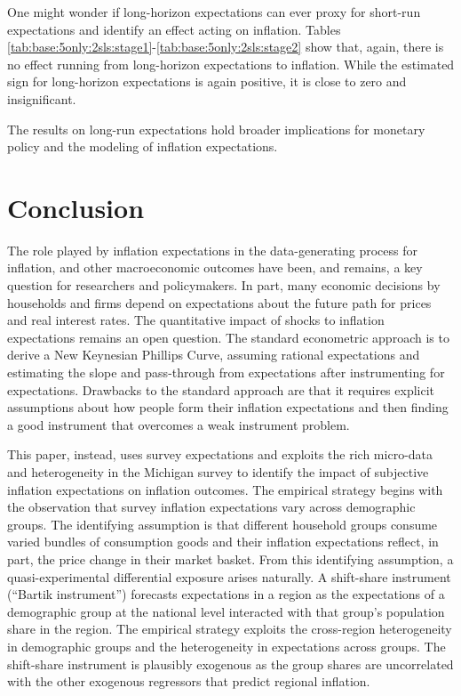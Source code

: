 \documentclass[12pt]{article}
\begin{document}



One might wonder if long-horizon expectations can ever proxy for short-run expectations and identify an effect acting on inflation. Tables \ref{tab:base:5only:2sls:stage1}-\ref{tab:base:5only:2sls:stage2} show that, again, there is no effect running from long-horizon expectations to inflation. While the estimated sign for long-horizon expectations is again positive, it is close to zero and insignificant.  




The results on long-run expectations hold broader implications for monetary policy and the modeling of inflation expectations.
\section{Conclusion}


The role played by inflation expectations in the data-generating process for inflation, and other macroeconomic outcomes have been, and remains, a key question for researchers and policymakers. In part, many economic decisions by households and firms depend on expectations about the future path for prices and real interest rates. The quantitative impact of shocks to inflation expectations remains an open question. The standard econometric approach is to derive a New Keynesian Phillips Curve, assuming rational expectations and estimating the slope and pass-through from expectations after instrumenting for expectations. Drawbacks to the standard approach are that it requires explicit assumptions about how people form their inflation expectations and then finding a good instrument that overcomes a weak instrument problem.

This paper, instead, uses survey expectations and exploits the rich micro-data and heterogeneity in the Michigan survey to identify the impact of subjective inflation expectations on inflation outcomes. The empirical strategy begins with the observation that survey inflation expectations vary across demographic groups. The identifying assumption is that different household groups consume varied bundles of consumption goods and their inflation expectations reflect, in part, the price change in their market basket. From this identifying assumption, a quasi-experimental differential exposure arises naturally. A shift-share instrument (``Bartik instrument'') forecasts expectations in a region as the expectations of a demographic group at the national level interacted with that group's population share in the region. The empirical strategy exploits the cross-region heterogeneity in demographic groups and the heterogeneity in expectations across groups. The shift-share instrument is plausibly exogenous as the group shares are uncorrelated with the other exogenous regressors that predict regional inflation.
\end{document}
